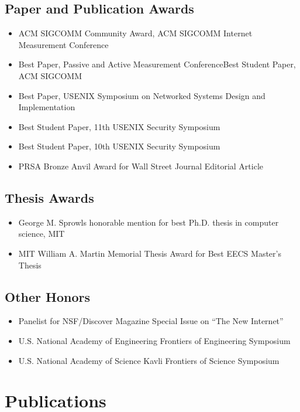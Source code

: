 \documentclass{article}
\begin{document}
\begin{cv}{}
\subsection*{Paper and Publication Awards}
\begin{itemize}
\itemsep=-1pt
\item ACM SIGCOMM Community Award, ACM SIGCOMM Internet Measurement Conference
\item Best Paper, Passive and Active Measurement ConferenceBest Student Paper, ACM SIGCOMM 
\item Best Paper, USENIX Symposium on Networked Systems Design and Implementation 
\item Best Student Paper, 11th USENIX Security Symposium
\item Best Student Paper, 10th USENIX Security Symposium
\item PRSA Bronze Anvil Award for Wall Street Journal Editorial Article
\end{itemize}

\subsection*{Thesis Awards}
\begin{itemize}
\itemsep=-1pt
\item George M. Sprowls honorable mention for best Ph.D. thesis in computer science, MIT 
\item MIT William A. Martin Memorial Thesis Award for Best EECS Master’s Thesis
\end{itemize}

\subsection*{Other Honors}

\begin{itemize}
\itemsep=-1pt
\item Panelist for NSF/Discover Magazine Special Issue on “The New Internet”
\item U.S. National Academy of Engineering Frontiers of Engineering Symposium
\item U.S. National Academy of Science Kavli Frontiers of Science
  Symposium
\end{itemize}

\newpage
\section*{Publications}
\label{sec:research}


\end{cv}
\end{document}
